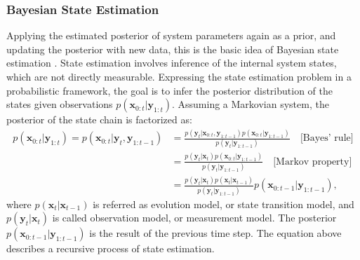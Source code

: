 \subsubsection{Bayesian State Estimation}
Applying the estimated posterior of system parameters again as a prior, and updating the posterior with new data, this is the basic idea of Bayesian state estimation \citep{bayesestimation}. State estimation involves inference of the internal system states, which are not directly measurable. Expressing the state estimation problem in a probabilistic framework, the goal is to infer the posterior distribution of the states given observations $p(\boldsymbol{x}_{0:t}|\boldsymbol{y}_{1:t})$. Assuming a Markovian system, the posterior of the state chain is factorized as:
\begin{equation}
    \begin{split}
        p(\boldsymbol{x}_{0:t}|\boldsymbol{y}_{1:t})=p(\boldsymbol{x}_{0:t}|\boldsymbol{y}_{t}, \boldsymbol{y}_{1:t-1})&=\frac{p(\boldsymbol{y}_t|\boldsymbol{x}_{0:t}, \boldsymbol{y}_{1:t-1})p(\boldsymbol{x}_{0:t}|\boldsymbol{y}_{1:t-1})}{p(\boldsymbol{y}_t|\boldsymbol{y}_{1:t-1})} \quad\text{[Bayes' rule]} \\
        &=\frac{p(\boldsymbol{y}_t|\boldsymbol{x}_t)p(\boldsymbol{x}_{0:t}|\boldsymbol{y}_{1:t-1})}{p(\boldsymbol{y}_t|\boldsymbol{y}_{1:t-1})} \quad\text{[Markov property]} \\
        &=\frac{p(\boldsymbol{y}_t|\boldsymbol{x}_t)p(\boldsymbol{x}_{t}|\boldsymbol{x}_{t-1})}{p(\boldsymbol{y}_t|\boldsymbol{y}_{1:t-1})}p(\boldsymbol{x}_{0:t-1}|\boldsymbol{y}_{1:t-1}),
    \end{split}
\end{equation}
where $p(\boldsymbol{x}_{t}|\boldsymbol{x}_{t-1})$ is referred as evolution model, or state transition model, and $p(\boldsymbol{y}_t|\boldsymbol{x}_t)$ is called observation model, or measurement model. The posterior $p(\boldsymbol{x}_{0:t-1}|\boldsymbol{y}_{1:t-1})$ is the result of the previous time step. The equation above describes a recursive process of state estimation.

